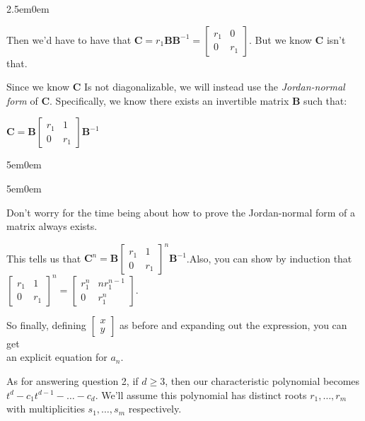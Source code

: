 \documentclass{book}
\newcommand{\myComment}{%
   \color{RawerSienna}%
   \fontsize{12}{14}\selectfont%
}
\newenvironment{myIndent}{%
   \begin{adjustwidth}{2.5em}{0em}%
}{%
   \end{adjustwidth}%
}
\newenvironment{myDindent}{%
   \begin{adjustwidth}{5em}{0em}%
}{%
   \end{adjustwidth}%
}
\newcommand{\retTwo}{\hfill\bigbreak}
\begin{document}
\begin{myIndent}
   Then we'd have to have that $\bm{C} = r_1\bm{B}\bm{B}^{-1} = 
   \begin{bmatrix}
      r_1 & 0 \\ 0 & r_1
   \end{bmatrix}$. But we know $\bm{C}$ isn't that.\retTwo

   Since we know $\bm{C}$ Is not diagonalizable, we will instead use the \textit{Jordan-normal form} of $\bm{C}$. Specifically, we know there exists an invertible matrix $\bm{B}$ such that:

   {\centering $\bm{C} = \bm{B}
   \begin{bmatrix}
      r_1 & 1 \\ 0 & r_1
   \end{bmatrix}\bm{B}^{-1}$\par}
   
   \begin{myDindent}\begin{myDindent}\myComment
      Don't worry for the time being about how to prove the Jordan-normal form of a matrix always exists.\retTwo
   \end{myDindent}\end{myDindent}

   This tells us that $\bm{C}^n = 
   \bm{B}\begin{bmatrix}
      r_1 & 1 \\ 0 & r_1
   \end{bmatrix}^n\bm{B}^{-1}$.\retTwo Also, you can show by induction that $\begin{bmatrix}
      r_1 & 1 \\ 0 & r_1
   \end{bmatrix}^n = \begin{bmatrix}
      r_1^n & nr_1^{n-1} \\ 0 & r_1^n
   \end{bmatrix}$.

   So finally, defining $
   \begin{bmatrix}
      x \\ y
   \end{bmatrix}$ as before and expanding out the expression, you can get\\ [-8pt] \phantom{aaaaaaaaaaaaaaaaaaaaaaaaaaaaaaaaaaaaaaaaaaaaaaa} an explicit equation for $a_n$.\newpage
\end{myIndent}

As for answering question 2, if $d \geq 3$, then our characteristic polynomial becomes $t^d - c_1t^{d-1} - \ldots - c_d$. We'll assume this polynomial has distinct roots $r_1, \ldots, r_m$ with multiplicities $s_1, \ldots, s_m$ respectively.\retTwo
\end{document}
